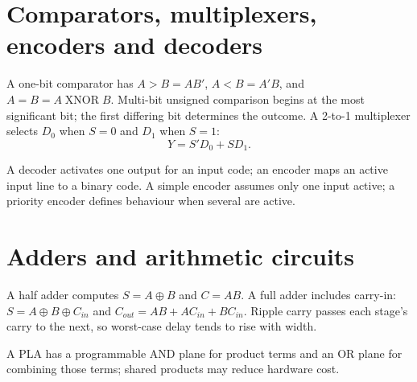\documentclass[11pt,a4paper]{article}
\begin{document}
\section{Comparators, multiplexers, encoders and decoders}
A one-bit comparator has $A>B=AB'$, $A<B=A'B$, and $A=B=A\operatorname{XNOR}B$. Multi-bit unsigned comparison begins at the most significant bit; the first differing bit determines the outcome.
A 2-to-1 multiplexer selects $D_0$ when $S=0$ and $D_1$ when $S=1$:
\[Y=S'D_0+SD_1.\]
\begin{center}\end{center}
A decoder activates one output for an input code; an encoder maps an active input line to a binary code. A simple encoder assumes only one input active; a priority encoder defines behaviour when several are active.
\section{Adders and arithmetic circuits}
A half adder computes $S=A\oplus B$ and $C=AB$. A full adder includes carry-in: $S=A\oplus B\oplus C_{in}$ and $C_{out}=AB+AC_{in}+BC_{in}$. Ripple carry passes each stage's carry to the next, so worst-case delay tends to rise with width.
\begin{center}\end{center}
A PLA has a programmable AND plane for product terms and an OR plane for combining those terms; shared products may reduce hardware cost.
\end{document}
